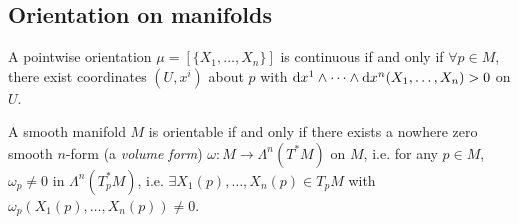\subsection{Orientation on manifolds}
A pointwise orientation $\mu = [\{X_1, \dots, X_n\}]$ is
continuous if and only if $\forall p \in M$, there exist coordinates
$(U, x^i)$ about $p$ with
$\mathop{}\!\mathrm{d} x^1 \wedge \cdots \wedge \mathop{}\!\mathrm{d} x^n (X_1, \dots, X_n) > 0$ on $U$.

\begin{theorem}
A smooth manifold $M$ is orientable if and only if there exists a
nowhere zero smooth $n$-form (a \emph{volume form})
$\omega : M \to \Lambda^n(T^\ast M)$ on $M$, i.e. for any
$p \in M$, $\omega_p \neq 0$ in $\Lambda^n(T_p^\ast M)$, i.e.
$\exists X_1(p), \dots, X_n(p) \in T_p M$ with
$\omega_p(X_1(p), \dots, X_n(p)) \neq 0$.
\end{theorem}

